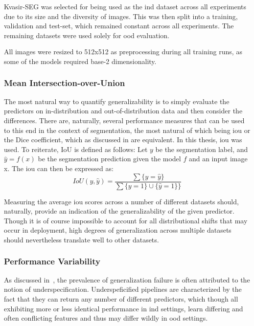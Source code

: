     Kvasir-SEG was selected for being used as the \gls{ind} dataset across all experiments due to its size and the diversity of images. This was then split into a training, validation and test-set, which remained constant across all experiments. The remaining datasets were used solely for \gls{ood} evaluation.
    
    All images were resized to 512x512 as preprocessing during all training runs, as some of the models required base-2 dimensionality.
    
    \subsubsection{Mean Intersection-over-Union}
    
    The most natural way to quantify generalizability is to simply evaluate the predictors on in-distribution and out-of-distribution data and then consider the differences. There are, naturally, several performance measures that can be used to this end in the context of segmentation, the most natural of which being \gls{iou} or the Dice coefficient, which as discussed in  are equivalent. In this thesis, \gls{iou} was used. To reiterate, IoU is defined as follows:
    Let \(y\) be the segmentation label, and \(\hat{y}=f(x)\) be the segmentation prediction given the model \(f\) and an input image x. The \gls{iou} can then be expressed as: 
    \begin{equation*}
        IoU(y, \hat{y}) = \frac{\sum \{y=\hat{y}\} }{\sum \{y=1\} \cup \{\hat{y}=1\}\}}
    \end{equation*}
    
    Measuring the average \gls{iou} scores across a number of different datasets should, naturally, provide an indication of the generalizability of the given predictor. Though it is of course impossible to account for all distributional shifts that may occur in deployment, high degrees of generalization across multiple datasets should nevertheless translate well to other datasets. 

    
    \subsubsection{Performance Variability}
    As discussed in~, the prevalence of generalization failure is often attributed to the notion of underspecification. Underspeficified pipelines are characterized by the fact that they can return any number of different predictors, which though all exhibiting more or less identical performance in \gls{ind} settings, learn differing and often conflicting features and thus may differ wildly in \gls{ood} settings. 
    
